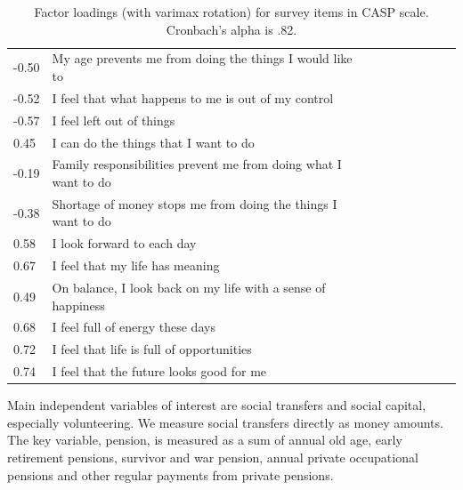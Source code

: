 \documentclass[10pt, letterpaper]{article}
\begin{document}
\begin{spacing}{1.4}
\begin{table}[h!]
  \centering
  \begin{tabular}{lllllllll} %
\hline
  -0.50& My age prevents me from doing the things I would like to\\
  -0.52& I feel that what happens to me is out of my control\\
  -0.57& I feel left out of things\\
   0.45& I can do the things that I want to do\\
  -0.19& Family responsibilities prevent me from doing what I want to do\\
  -0.38& Shortage of money stops me from doing the things I want to do\\
   0.58& I look forward to each day\\
   0.67& I feel that my life has meaning\\
   0.49& On balance, I look back on my life with a sense of happiness\\
   0.68& I feel full of energy these days\\
   0.72& I feel that life is full of opportunities\\
   0.74& I feel that the future looks good for me\\\hline
  \end{tabular}
  \caption{Factor loadings (with varimax rotation) for survey items in CASP scale. Cronbach's alpha is
    .82.}
  \label{casp}
\end{table}


Main independent variables of interest are social transfers and social capital,
especially volunteering. We  measure social transfers directly as money amounts. %
 The key variable, pension, is measured as a sum of annual old age, early
 retirement pensions, survivor and war pension, annual private occupational
 pensions and other regular payments from private pensions. %




\end{spacing}
\end{document}
